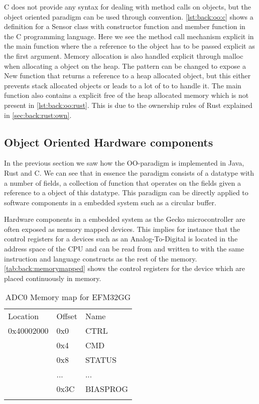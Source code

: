 C does not provide any syntax for dealing with method calls on objects, but the object oriented paradigm can be used through convention.
\autoref{lst:back:oo:c} shows a definition for a Sensor class with constructor function and member function in the C programming language.
Here we see the method call mechanism explicit in the main function where the a reference to the object has to be passed explicit as the first argument.
Memory allocation is also handled explicit through malloc when allocating a object on the heap.
The pattern can be changed to expose a New function that returns a reference to a heap allocated object, but this either prevents stack allocated objects or leads to a lot of to to handle it.
The main function also contains a explicit free of the heap allocated memory which is not present in \autoref{lst:back:oo:rust}.
This is due to the ownership rules of Rust explained in \autoref{sec:back:rust:own}.

\subsection{Object Oriented Hardware components}

In the previous section we saw how the OO-paradigm is implemented in Java, Rust and C.
We can see that in essence the paradigm consists of a datatype with a number of fields, a collection of function that operates on the fields given a reference to a object of this datatype.
This paradigm can be directly applied to software components in a embedded system such as a circular buffer.

Hardware components in a embedded system as the Gecko microcontroller are often exposed as memory mapped devices.
This implies for instance that the control registers for a devices such as an Analog-To-Digital is located in the address space of the CPU and can be read from and written to with the same instruction and language constructs as the rest of the memory.
\autoref{tab:back:memorymapped} shows the control registers for the device which are placed continuously in memory.

\begin{table}[H]
  \centering
  \begin{tabular}{l|l|l|}
    &&\\
    \hline
    Location&Offset&Name\\
    \hline
    0x40002000&0x0&CTRL\\
    \hline
    &0x4&CMD\\
    \hline
    &0x8&STATUS\\
    \hline
    &...&... \\
    \hline
    &0x3C&BIASPROG\\
    \hline
    &&\\

  \end{tabular}
  \caption{ADC0 Memory map for EFM32GG}
  \label{tab:back:memorymapped}
\end{table}

